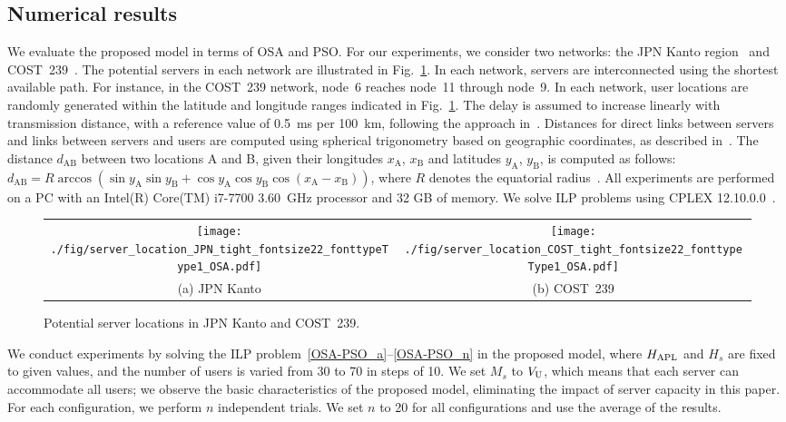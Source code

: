 \documentclass[conference]{IEEEtran}
\begin{document}
\begin{CJK}{UTF8}{ipxm}
\section{Numerical results}
\label{sec:numerical_results}
We evaluate the proposed model in terms of OSA and PSO.
% 
For our experiments, we consider two networks: the JPN Kanto region~\cite{JPN} and COST~239~\cite{COST}. 
The potential servers in each network are illustrated in Fig.~\ref{fig:ServerLocation}.
In each network, servers are interconnected using the shortest available path.
For instance, in the COST~239 network, node~6 reaches node~11 through node~9.
In each network, user locations are randomly generated within the latitude and longitude ranges indicated in Fig.~\ref{fig:ServerLocation}.
The delay is assumed to increase linearly with transmission distance, with a reference value of 0.5~ms per 100~km, following the approach in~\cite{KawabataICC2023}.
Distances for direct links between servers and links between servers and users are computed using spherical trigonometry based on geographic coordinates, as described in~\cite{12Imanaka2024}.
The distance $d_\mathrm{AB}$ between two locations A and B, given their longitudes $x_\mathrm{A}$, $x_\mathrm{B}$ and latitudes $y_\mathrm{A}$, $y_\mathrm{B}$, is computed as follows:
$d_\mathrm{AB} = R \arccos\left( \sin y_\mathrm{A} \sin y_\mathrm{B} + \cos y_\mathrm{A} \cos y_\mathrm{B} \cos(x_\mathrm{A} - x_\mathrm{B}) \right)$,
where $R$ denotes the equatorial radius~\cite{Zohora2018}.
All experiments are performed on a PC with an Intel(R) Core(TM) i7-7700 3.60~GHz processor and 32 GB of memory.
We solve ILP problems using CPLEX 12.10.0.0~\cite{CPLEX}.
\begin{figure}[t]
  \begin{center}
      \begin{tabular}{cc}
      \texttt{[image: ./fig/server\_location\_JPN\_tight\_fontsize22\_fonttypeType1\_OSA.pdf]} &
      \texttt{[image: ./fig/server\_location\_COST\_tight\_fontsize22\_fonttypeType1\_OSA.pdf]} \\
      (a) JPN Kanto & (b) COST~239
      \end{tabular}
  \end{center}
      \vspace{-0.3cm}
  \caption{Potential server locations in JPN Kanto and COST~239.}
  \label{fig:ServerLocation}
\end{figure}

We conduct experiments by solving the ILP problem~\eqref{OSA-PSO_a}--\eqref{OSA-PSO_n} in the proposed model, where $H_{\rm APL}$ and $H_s$ are fixed to given values, and the number of users is varied from 30 to 70 in steps of 10.
We set $M_s$ to $V_{\rm U}$, which means that each server can accommodate all users; we observe the basic characteristics of the proposed model, eliminating the impact of server capacity in this paper.
For each configuration, we perform $n$ independent trials.
We set $n$ to 20 for all configurations
and use the average of the results.


\end{CJK}
\end{document}
